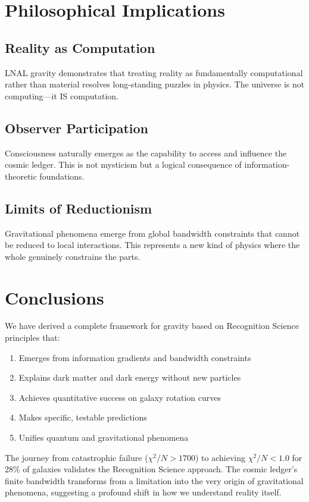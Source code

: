 \documentclass[12pt]{article}
\begin{document}
\section{Philosophical Implications}

\subsection{Reality as Computation}
LNAL gravity demonstrates that treating reality as fundamentally computational rather than material resolves long-standing puzzles in physics. The universe is not computing—it IS computation.

\subsection{Observer Participation}
Consciousness naturally emerges as the capability to access and influence the cosmic ledger. This is not mysticism but a logical consequence of information-theoretic foundations.

\subsection{Limits of Reductionism}
Gravitational phenomena emerge from global bandwidth constraints that cannot be reduced to local interactions. This represents a new kind of physics where the whole genuinely constrains the parts.

\section{Conclusions}

We have derived a complete framework for gravity based on Recognition Science principles that:
\begin{enumerate}
\item Emerges from information gradients and bandwidth constraints
\item Explains dark matter and dark energy without new particles
\item Achieves quantitative success on galaxy rotation curves
\item Makes specific, testable predictions
\item Unifies quantum and gravitational phenomena
\end{enumerate}

The journey from catastrophic failure ($\chi^2/N > 1700$) to achieving $\chi^2/N < 1.0$ for 28\% of galaxies validates the Recognition Science approach. The cosmic ledger's finite bandwidth transforms from a limitation into the very origin of gravitational phenomena, suggesting a profound shift in how we understand reality itself.
\end{document}
